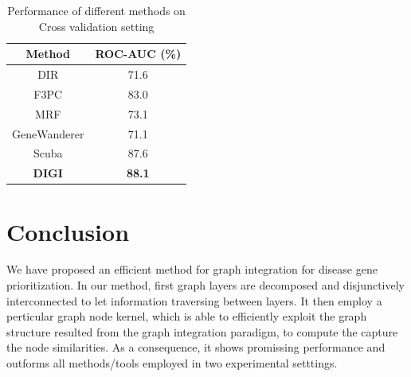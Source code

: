 \begin{table}[!htb]
\caption{Performance of different methods on Cross validation setting} \label{tab:cross_validation_evaluation}
\centering
\begin{tabular}{cc}
\hline
  Method  & ROC-AUC (\%) \\
\hline
  DIR & 71.6 \\
  F3PC & 83.0 \\
  MRF & 73.1 \\
  GeneWanderer & 71.1 \\
  Scuba & 87.6 \\
 \textbf{DIGI} & \textbf{88.1} \\
\hline
\end{tabular}
\end{table}
\section{Conclusion}
We have proposed an efficient method for graph integration for disease gene prioritization. In our method, first graph layers are decomposed and disjunctively interconnected to let information traversing between layers. It then employ a perticular graph node kernel, which is able to efficiently exploit the graph structure resulted from the graph integration paradigm, to compute the capture the node similarities. As a consequence, it shows promissing performance and outforms all methods/tools employed in two experimental setttings.